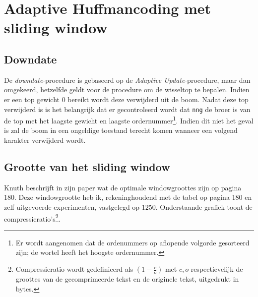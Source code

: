 \section{Adaptive Huffmancoding met sliding window}

\subsection{Downdate}
De \emph{downdate}-procedure is gebaseerd op de \emph{Adaptive Update}-procedure, maar dan omgekeerd, hetzelfde geldt voor de procedure om de wisseltop te bepalen. Indien er een top gewicht $0$ bereikt wordt deze verwijderd uit de boom. Nadat deze top verwijderd is is het belangrijk dat er gecontroleerd wordt dat \texttt{nng} de broer is van de top met het laagste gewicht en laagste ordernummer\footnote{Er wordt aangenomen dat de ordenummers op aflopende volgorde gesorteerd zijn; de wortel heeft het hoogste ordernummer.}. Indien dit niet het geval is zal de boom in een ongeldige toestand terecht komen wanneer een volgend karakter verwijderd wordt. 

\subsection{Grootte van het sliding window}
Knuth beschrijft in zijn paper \cite{knuthhuffman} wat de optimale windowgroottes zijn op pagina 180. Deze windowgrootte heb ik, rekeninghoudend met de tabel op pagina 180 en zelf uitgevoerde experimenten, vastgelegd op $1250$. Onderstaande grafiek toont de compressieratio's\footnote{Compressieratio wordt gedefinieerd als $(1-\frac{c}{o})$ met $c,o$ respectievelijk de groottes van de gecomprimeerde tekst en de originele tekst, uitgedrukt in bytes.}.